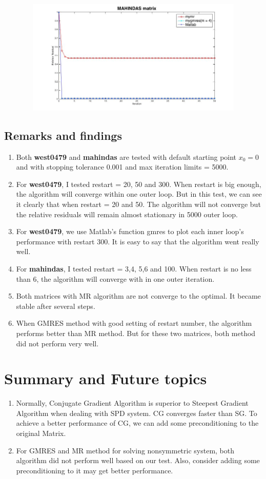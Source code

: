 \documentclass[fleqn]{article}
\begin{document}
 \begin{figure}[h]
 \centering
      \includegraphics[width = 12cm, height = 5.5cm]{mah4.jpg}
      \end{figure}
\newpage
\subsection{Remarks and findings}
   \begin{enumerate}
       \item Both \textbf{west0479} and \textbf{mahindas} are tested with default starting point $x_0 = 0$ and with stopping tolerance 0.001 and max iteration limits = 5000. 
       \item For \textbf{west0479}, I tested restart = 20, 50 and 300. When restart is big enough, the algorithm will converge within one outer loop. But in this test, we can see it clearly that when restart = 20 and 50. The algorithm will not converge but the relative residuals will remain almost stationary in 5000 outer loop. 
       \item For \textbf{west0479}, we use Matlab's function gmres to plot each inner loop's performance with restart 300. It is easy to say that the algorithm went really well. 
       \item For \textbf{mahindas}, I tested restart  = 3,4, 5,6 and 100. When restart is no less than 6, the algorithm will converge with in one outer iteration. 
       \item Both matrices with MR algorithm are not converge to the optimal. It became stable after several steps. 
       \item When GMRES method with good setting of restart number, the algorithm performs better than MR method. But for these two matrices, both method did not perform very well. 
   \end{enumerate}

\section{Summary and Future topics}
\begin{enumerate}
    \item Normally, Conjugate Gradient Algorithm is superior to Steepest Gradient Algorithm when dealing with SPD system. CG converges faster than SG. To achieve a better performance of CG, we can add some preconditioning to the original Matrix.  
    \item For GMRES and MR method for solving nonsymmetric system, both algorithm did not perform well based on our test. Also, consider adding some preconditioning to it may get better performance. 
\end{enumerate}
\end{document}
